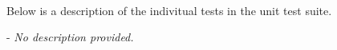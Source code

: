 
 \\
Below is a description of the indivitual tests in the  unit test suite. \\
\vspace{5mm} %
\begin{spaceditemize}
  \item \textbf{\texttt{}} -
    \textit{No description provided.}
\end{spaceditemize}
\vspace{5mm} %
